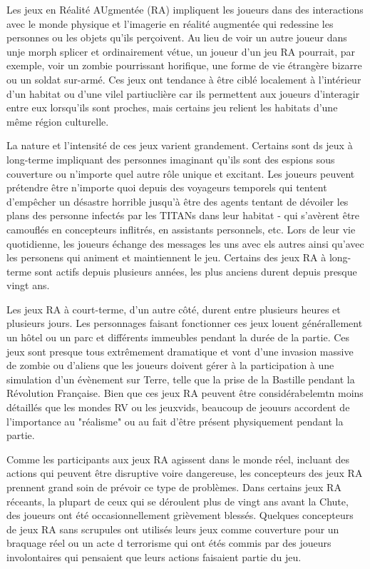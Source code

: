                Les jeux en Réalité AUgmentée (RA) impliquent les joueurs dans des interactions avec le monde physique et l'imagerie en réalité augmentée qui redessine les personnes ou les objets qu'ils perçoivent. Au lieu de voir un autre joueur dans unje morph splicer et ordinairement vétue, un joueur d'un jeu RA pourrait, par exemple, voir un zombie pourrissant horifique, une forme de vie étrangère bizarre ou un soldat sur-armé. Ces jeux ont tendance à être ciblé localement à l'intérieur d'un habitat ou d'une vilel partiuclière car ils permettent aux joueurs d'interagir entre eux lorsqu'ils sont proches, mais certains jeu relient les habitats d'une même région culturelle. 

               La nature et l'intensité de ces jeux varient grandement. Certains sont ds jeux à long-terme impliquant des personnes imaginant qu'ils sont des espions sous couverture ou n'importe quel autre rôle unique et excitant. Les joueurs peuvent prétendre être n'importe quoi depuis des voyageurs temporels qui tentent d'empêcher un désastre horrible jusqu'à être des agents tentant de dévoiler les plans des personne infectés par les TITANs dans leur habitat - qui s'avèrent être camouflés en concepteurs inflitrés, en assistants personnels, etc. Lors de leur vie quotidienne, les joueurs échange des messages les uns avec els autres ainsi qu'avec les personens qui animent et maintiennent le jeu. Certains des jeux RA à long-terme sont actifs depuis plusieurs années, les plus anciens durent depuis presque vingt ans. 

               Les jeux RA à court-terme, d'un autre côté, durent entre plusieurs heures et plusieurs jours. Les personnages faisant fonctionner ces jeux louent générallement un hôtel ou un parc et différents immeubles pendant la durée de la partie. Ces jeux sont presque tous extrêmement dramatique et vont d'une invasion massive de zombie ou d'aliens que les joueurs doivent gérer à la participation à une simulation d'un évènement sur Terre, telle que la prise de la Bastille pendant la Révolution Française. Bien que ces jeux RA peuvent être considérabelemtn moins détaillés que les mondes RV ou les jeuxvids, beaucoup de jeouurs accordent de l'importance au "réalisme" ou au fait d'être présent physiquement pendant la partie. 

               Comme les participants aux jeux RA agissent dans le monde réel, incluant des actions qui peuvent être disruptive voire dangereuse, les concepteurs des jeux RA prennent grand soin de prévoir ce type de problèmes. Dans certains jeux RA réceants, la plupart de ceux qui se déroulent plus de vingt ans avant la Chute, des joueurs ont été occasionnellement grièvement blessés. Quelques concepteurs de jeux RA sans scrupules ont utilisés leurs jeux comme couverture pour un braquage réel ou un acte d terrorisme qui ont étés commis par des joueurs involontaires qui pensaient que leurs actions faisaient partie du jeu. 

